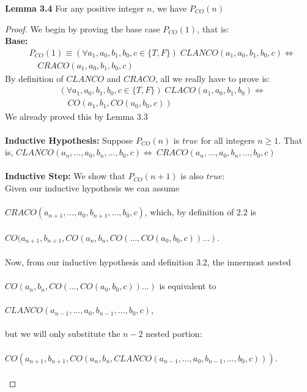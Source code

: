 \documentclass{article}
\begin{document}
\noindent \textbf{Lemma 3.4}  For any positive integer $n$, we have $ P_{CO}(n)$
\begin{proof} We begin by proving the base case $P_{CO}(1)$, that is: \\ 
	\textbf{Base:}
	\begin{align*}
	 & P_{CO}(1) \equiv  (\forall a_1, a_0, b_1, b_0, c \in \{T, F\} ) \;  CLANCO(a_1, a_0, b_1, b_0, c) \iff  \\ & \quad  CRACO(a_1, a_0, b_1, b_0, c) 
	\end{align*}
	By definition of $CLANCO$ and $CRACO$, all we really have to prove is:
	\begin{align*}
	&  (\forall a_1, a_0, b_1, b_0, c \in \{T, F\} ) \; CLACO(a_1, a_0, b_1, b_0) \iff \\ 
	& \quad CO(a_1, b_1, CO(a_0, b_0, c)) 
	\end{align*}
	We already proved this by Lemma 3.3 \\ \\
	\textbf{Inductive Hypothesis:} Suppose $P_{CO}(n) $ is $true$ for all integers $n \geq 1$. That is, $CLANCO(a_n, \ldots, a_0, b_n, \ldots, b_0, c) \iff 
	 \: CRACO(a_n, \ldots, a_0, b_n, \ldots, b_0, c)$  \\ \\
	\textbf{Inductive Step:} We show that $P_{CO}(n+1)$ is also $true$: \\
	Given our inductive hypothesis we can assume \\  \\
	 $ CRACO(a_{n+1}, \ldots, a_0, b_{n+1}, \ldots, b_0, c)$, which, by definition of 2.2 is \\ \\
	   $CO(a_{n+1}, b_{n+1}, CO(a_n, b_n, CO(\ldots, CO(a_0, b_0, c))\ldots)$. \\ \\
	    Now, from our inductive hypothesis and definition 3.2, the innermost nested \\ \\
	     $CO(a_n, b_n, CO(\ldots, CO(a_0, b_0, c))\ldots)$  is equivalent to \\ \\
	      $ CLANCO(a_{n-1},  \ldots, a_0, b_{n-1}, \ldots, b_0, c)$, \\ \\ 
	      but we will only substitute the $n-2$ nested portion: \\ \\
	    
	       $CO(a_{n+1}, b_{n+1}, CO(a_n, b_n, CLANCO(a_{n-1}, 
	       \ldots, a_0, b_{n-1}, \ldots, b_0, c)))$. \\ \\
	       

\end{proof}
\end{document}
